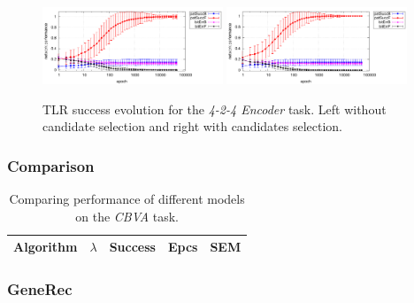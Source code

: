 \begin{figure}[H]
  \centering
  \includegraphics[width=0.48\textwidth]{img/tlr-k3-3-best-perf.pdf}   
  \includegraphics[width=0.48\textwidth]{img/tlr-k3-3-best-can.pdf}      
  \caption{TLR success evolution for the \emph{4-2-4 Encoder} task. Left without candidate selection and right with candidates selection. }
  \label{fig:results-tlr-k3-epoch} 
\end{figure}

\subsubsection{Comparison} 
\label{sec:results-cmp-k3} 


\begin{table}
  \centering
    \begin{tabular}{|l|l|l|l|l|}
    \hline
    Algorithm&$\lambda$&Success&Epcs&SEM \\
    \hline
    \end{tabular}
  \caption{Comparing performance of different models on the \emph{CBVA} task.} 
  \label{tab:results-cmp-k3}
\end{table}


\subsubsection{GeneRec} 

